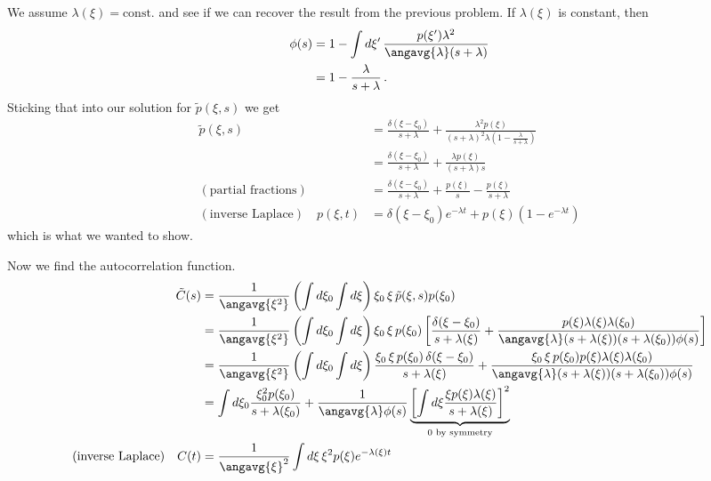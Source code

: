 We assume $\lambda(\xi) = \text{const.}$ and see if we can recover the result from the previous problem.
If $\lambda(\xi)$ is constant, then
\begin{align}
  \phi(s)
  &= 1 - \int d\xi' \, \frac{p(\xi') \lambda^2}{\angavg{\lambda}(s + \lambda)} \nonumber \\
  &= 1 - \frac{\lambda}{s + \lambda}
  \, .
\end{align}
Sticking that into our solution for $\tilde{p}(\xi, s)$ we get
\begin{align}
  \tilde{p}(\xi, s)
  &= \frac{\delta(\xi - \xi_0)}{s + \lambda}
  + \frac{\lambda^2 p(\xi)}{(s + \lambda)^2 \lambda \left( 1 - \frac{\lambda}{s + \lambda}\right)} \nonumber \\
  &= \frac{\delta(\xi - \xi_0)}{s + \lambda}
  + \frac{\lambda p(\xi)}{(s + \lambda) s} \nonumber \\
  (\text{partial fractions}) \quad
  &= \frac{\delta(\xi - \xi_0)}{s + \lambda} + \frac{p(\xi)}{s} - \frac{p(\xi)}{s + \lambda} \nonumber \\
  (\text{inverse Laplace}) \quad
  p(\xi, t) &= \delta(\xi - \xi_0) e^{-\lambda t} + p(\xi) \left( 1 - e^{-\lambda t} \right) \nonumber
\end{align}
which is what we wanted to show.

Now we find the autocorrelation function.
\begin{align}
  \tilde{C}(s)
  &= \frac{1}{\angavg{\xi^2}}
    \left( \int d\xi_0 \int d\xi \right)
    \xi_0 \, \xi \, \tilde{p}(\xi, s) p(\xi_0)
    \nonumber \\
  &= \frac{1}{\angavg{\xi^2}}
    \left( \int d\xi_0 \int d\xi \right)
      \xi_0 \, \xi \, p(\xi_0)
    \left[
      \frac{\delta(\xi - \xi_0)}{s + \lambda(\xi)} + \frac{p(\xi)\lambda(\xi)\lambda(\xi_0)}{\angavg{\lambda}(s + \lambda(\xi))(s + \lambda(\xi_0))\phi(s)}
    \right] \nonumber \\
  &= \frac{1}{\angavg{\xi^2}}
    \left( \int d\xi_0 \int d\xi \right)
    \frac{\xi_0 \, \xi \, p(\xi_0) \, \delta(\xi - \xi_0)}{s + \lambda(\xi)}
    + \frac{\xi_0 \, \xi \, p(\xi_0) p(\xi) \lambda(\xi) \lambda(\xi_0)}{\angavg{\lambda}(s + \lambda(\xi))(s + \lambda(\xi_0))\phi(s)}
    \nonumber \\
  &= \int d\xi_0 \frac{\xi_0^2 p(\xi_0)}{s + \lambda(\xi_0)}
    + \frac{1}{\angavg{\lambda}\phi(s)}
    \underbrace{\left[
      \int d\xi \frac{\xi p(\xi)\lambda(\xi)}{s + \lambda(\xi)}
    \right]^2}_{0\text{ by symmetry}}
  \nonumber \\
  \text{(inverse Laplace)} \quad C(t)
  &= \frac{1}{\angavg{\xi}^2} \int d\xi \, \xi^2 p(\xi) e^{-\lambda(\xi)t} \nonumber
\end{align}

